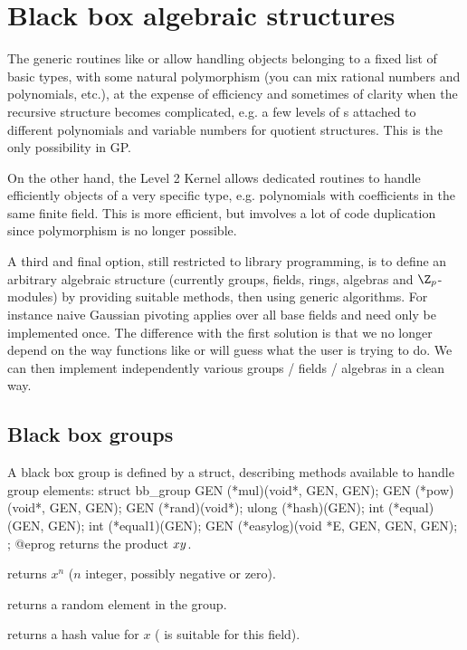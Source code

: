 \chapter{Black box algebraic structures}

The generic routines like  or  allow handling objects
belonging to a fixed list of basic types, with some natural polymorphism
(you can mix rational numbers and polynomials, etc.), at the expense of
efficiency and sometimes of clarity when the recursive structure becomes
complicated, e.g. a few levels of s attached to different
polynomials and variable numbers for quotient structures. This
is the only possibility in GP.

On the other hand, the Level 2 Kernel allows dedicated routines to handle
efficiently objects of a very specific type, e.g. polynomials with
coefficients in the same finite field. This is more efficient, but imvolves a
lot of code duplication since polymorphism is no longer possible.

A third and final option, still restricted to library programming, is to
define an arbitrary algebraic structure (currently groups, fields, rings,
algebras and $\Z_p$-modules) by providing suitable methods, then using generic
algorithms. For instance naive Gaussian pivoting applies over all base fields
and need only be implemented once. The difference with the first solution
is that we no longer depend on the way functions like  or
 will guess what the user is trying to do. We can then implement
independently various groups / fields / algebras in a clean way.

\section{Black box groups}

A black box group is defined by a  struct, describing methods
available to handle group elements:
\bprog
    struct bb_group
    {
      GEN (*mul)(void*, GEN, GEN);
      GEN (*pow)(void*, GEN, GEN);
      GEN (*rand)(void*);
      ulong (*hash)(GEN);
      int (*equal)(GEN, GEN);
      int (*equal1)(GEN);
      GEN (*easylog)(void *E, GEN, GEN, GEN);
    };
@eprog
 returns the product $x\*y$.

 returns $x^n$ ($n$ integer, possibly negative or zero).

 returns a random element in the group.

 returns a hash value for $x$ ( is suitable for this field).

